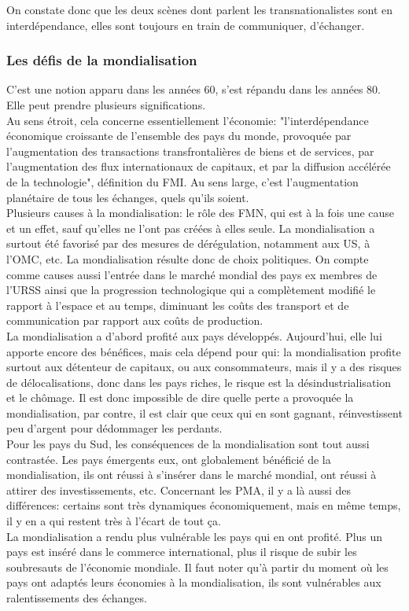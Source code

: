 \documentclass[10pt, a4paper, openany]{book}
\begin{document}
On constate donc que les deux scènes dont parlent les transnationalistes sont en interdépendance, elles sont toujours en train de communiquer, d'échanger. 

\subsubsection{Les défis de la mondialisation}

C'est une notion apparu dans les années 60, s'est répandu dans les années 80. Elle peut prendre plusieurs significations. \\
Au sens étroit, cela concerne essentiellement l'économie: "l'interdépendance économique croissante de l'ensemble des pays du monde, provoquée par l'augmentation des transactions transfrontalières de biens et de services, par l'augmentation des flux internationaux de capitaux, et par la diffusion accélérée de la technologie", définition du FMI. Au sens large, c'est l'augmentation planétaire de tous les échanges, quels qu'ils soient. \\
Plusieurs causes à la mondialisation: le rôle des FMN, qui est à la fois une cause et un effet, sauf qu'elles ne l'ont pas créées à elles seule. La mondialisation a surtout été favorisé par des mesures de dérégulation, notamment aux US, à l'OMC, etc. La mondialisation résulte donc de choix politiques. On compte comme causes aussi l'entrée dans le marché mondial des pays ex membres de l'URSS ainsi que la progression technologique qui a complètement modifié le rapport à l'espace et au temps, diminuant les coûts des transport et de communication par rapport aux coûts de production. \\
La mondialisation a d'abord profité aux pays développés. Aujourd'hui, elle lui apporte encore des bénéfices, mais cela dépend pour qui: la mondialisation profite surtout aux détenteur de capitaux, ou aux consommateurs, mais il y a des risques de délocalisations, donc dans les pays riches, le risque est la désindustrialisation et le chômage. Il est donc impossible de dire quelle perte a provoquée la mondialisation, par contre, il est clair que ceux qui en sont gagnant, réinvestissent peu d'argent pour dédommager les perdants. \\
Pour les pays du Sud, les conséquences de la mondialisation sont tout aussi contrastée. Les pays émergents eux, ont globalement bénéficié de la mondialisation, ils ont réussi à s'insérer dans le marché mondial, ont réussi à attirer des investissements, etc. Concernant les PMA, il y a là aussi des différences: certains sont très dynamiques économiquement, mais en même temps, il y en a qui restent très à l'écart de tout ça. \\
La mondialisation a rendu plus vulnérable les pays qui en ont profité. Plus un pays est inséré dans le commerce international, plus il risque de subir les soubresauts de l'économie mondiale. Il faut noter qu'à partir du moment où les pays ont adaptés leurs économies à la mondialisation, ils sont vulnérables aux ralentissements des échanges.
\end{document}
